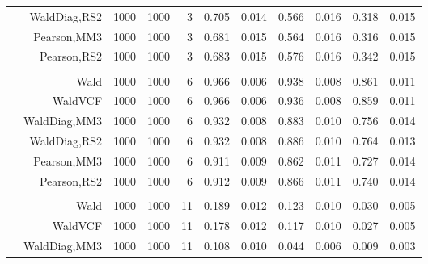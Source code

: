 \documentclass[
]{article}
\begin{document}
\begin{table}[H]
{\begin{tabular}[t]{lrrrrrrrlrr}
\hspace{1em} & WaldDiag,RS2 & 1000 & 1000 & 3 & 0.705 & 0.014 & 0.566 & 0.016 & 0.318 & 0.015\\

\hspace{1em} & Pearson,MM3 & 1000 & 1000 & 3 & 0.681 & 0.015 & 0.564 & 0.016 & 0.316 & 0.015\\

\hspace{1em} & Pearson,RS2 & 1000 & 1000 & 3 & 0.683 & 0.015 & 0.576 & 0.016 & 0.342 & 0.015\\
\cmidrule{1-11}
\addlinespace[0.3em]
\multicolumn{11}{l}{\textbf{1F 15V}}\\
\hspace{1em} & Wald & 1000 & 1000 & 6 & 0.966 & 0.006 & 0.938 & 0.008 & 0.861 & 0.011\\

\hspace{1em} & WaldVCF & 1000 & 1000 & 6 & 0.966 & 0.006 & 0.936 & 0.008 & 0.859 & 0.011\\

\hspace{1em} & WaldDiag,MM3 & 1000 & 1000 & 6 & 0.932 & 0.008 & 0.883 & 0.010 & 0.756 & 0.014\\

\hspace{1em} & WaldDiag,RS2 & 1000 & 1000 & 6 & 0.932 & 0.008 & 0.886 & 0.010 & 0.764 & 0.013\\

\hspace{1em} & Pearson,MM3 & 1000 & 1000 & 6 & 0.911 & 0.009 & 0.862 & 0.011 & 0.727 & 0.014\\

\hspace{1em} & Pearson,RS2 & 1000 & 1000 & 6 & 0.912 & 0.009 & 0.866 & 0.011 & 0.740 & 0.014\\
\cmidrule{1-11}
\addlinespace[0.3em]
\multicolumn{11}{l}{\textbf{2F 10V}}\\
\hspace{1em} & Wald & 1000 & 1000 & 11 & 0.189 & 0.012 & 0.123 & 0.010 & 0.030 & 0.005\\

\hspace{1em} & WaldVCF & 1000 & 1000 & 11 & 0.178 & 0.012 & 0.117 & 0.010 & 0.027 & 0.005\\

\hspace{1em} & WaldDiag,MM3 & 1000 & 1000 & 11 & 0.108 & 0.010 & 0.044 & 0.006 & 0.009 & 0.003\\


\end{tabular}}
\end{table}
\end{document}
